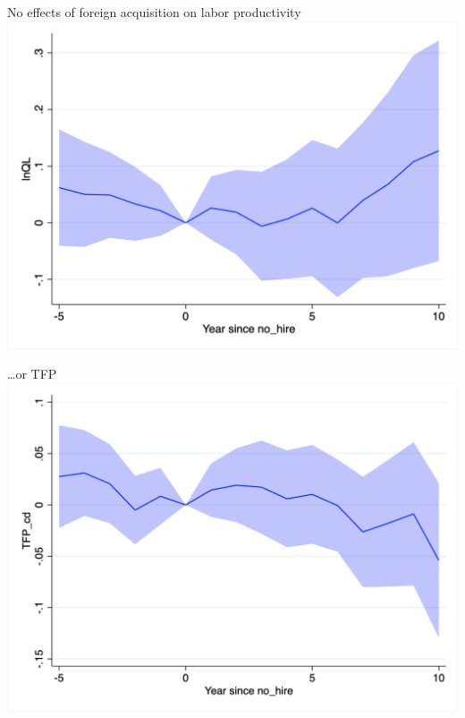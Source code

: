 \documentclass[
  ignorenonframetext,
  aspectratio=43,
]{beamer}
\begin{document}
\begin{frame}{No effects of foreign acquisition on labor productivity}
\protect\hypertarget{no-effects-of-foreign-acquisition-on-labor-productivity}{}
\includegraphics{figure/event_study/no_hire_lnQL.png}
\end{frame}

\begin{frame}{\ldots or TFP}
\protect\hypertarget{or-tfp}{}
\includegraphics{figure/event_study/no_hire_TFP_cd.png}
\end{frame}
\end{document}
